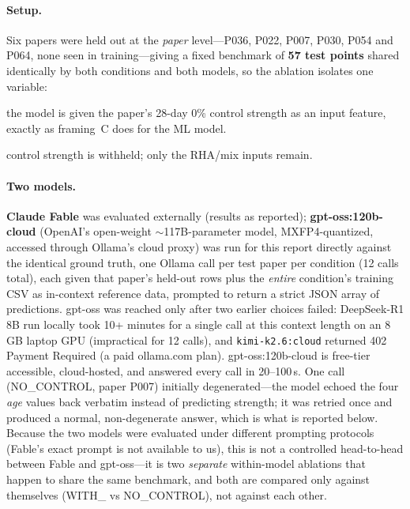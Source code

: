 \documentclass[11pt]{article}
\begin{document}
\paragraph{Setup.} Six papers were held out at the \emph{paper} level---P036, P022,
P007, P030, P054 and P064, none seen in training---giving a fixed benchmark of
\textbf{57 test points} shared identically by both conditions and both models, so the
ablation isolates one variable:
\begin{description}\itemsep2pt
  \item[WITH\_CONTROL] the model is given the paper's 28-day 0\% control strength as an
        input feature, exactly as framing~C does for the ML model.
  \item[NO\_CONTROL] control strength is withheld; only the RHA/mix inputs remain.
\end{description}

\paragraph{Two models.} \textbf{Claude Fable} was evaluated externally (results as
reported); \textbf{gpt-oss:120b-cloud} (OpenAI's open-weight $\sim$117B-parameter
model, MXFP4-quantized, accessed through Ollama's cloud proxy) was run for this report
directly against the identical ground truth, one Ollama call per test paper per
condition (12 calls total), each given that paper's held-out rows plus the \emph{entire}
condition's training CSV as in-context reference data, prompted to return a strict JSON
array of predictions. gpt-oss was reached only after two earlier choices failed:
DeepSeek-R1 8B run locally took 10+ minutes for a single call at this context length on
an 8\,GB laptop GPU (impractical for 12 calls), and \texttt{kimi-k2.6:cloud} returned
402 Payment Required (a paid ollama.com plan). gpt-oss:120b-cloud is free-tier
accessible, cloud-hosted, and answered every call in 20--100\,s. One call (NO\_CONTROL,
paper P007) initially degenerated---the model echoed the four \emph{age} values back
verbatim instead of predicting strength; it was retried once and produced a normal,
non-degenerate answer, which is what is reported below. Because the two models were
evaluated under different prompting protocols (Fable's exact prompt is not available to
us), this is not a controlled head-to-head between Fable and gpt-oss---it is two
\emph{separate} within-model ablations that happen to share the same benchmark, and
both are compared only against themselves (WITH\_ vs NO\_CONTROL), not against each
other.
\end{document}
